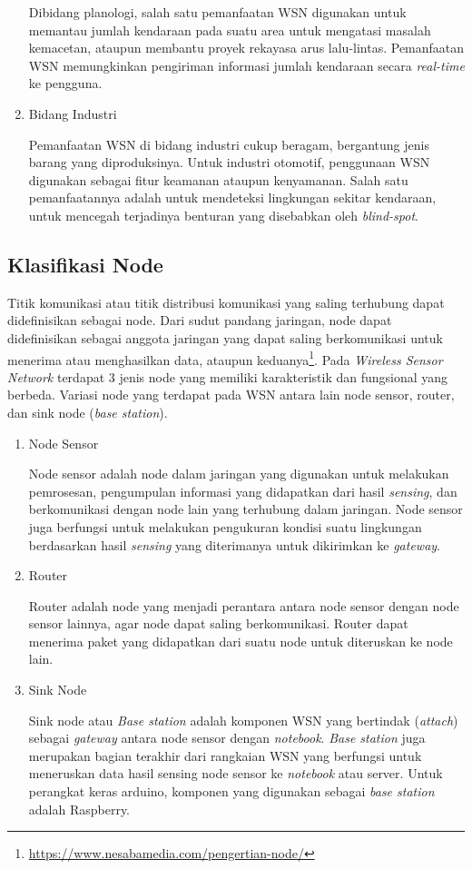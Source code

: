 \begin{enumerate}
    Dibidang planologi, salah satu pemanfaatan WSN digunakan untuk memantau jumlah kendaraan pada suatu area untuk mengatasi masalah kemacetan, ataupun membantu proyek rekayasa arus lalu-lintas. Pemanfaatan WSN memungkinkan pengiriman informasi jumlah kendaraan secara \textit{real-time} ke pengguna. 
    
    \item Bidang Industri
    
    Pemanfaatan WSN di bidang industri cukup beragam, bergantung jenis barang yang diproduksinya. Untuk industri otomotif, penggunaan WSN digunakan sebagai fitur keamanan ataupun kenyamanan. Salah satu pemanfaatannya adalah untuk mendeteksi lingkungan sekitar kendaraan, untuk mencegah terjadinya benturan yang disebabkan oleh \textit{blind-spot}.
    
\end{enumerate}

\subsection{Klasifikasi Node}
 Titik komunikasi atau titik distribusi komunikasi yang saling terhubung dapat didefinisikan sebagai node. Dari sudut pandang jaringan, node dapat didefinisikan sebagai anggota jaringan yang dapat saling berkomunikasi untuk menerima atau menghasilkan data, ataupun keduanya\footnote{\url{https://www.nesabamedia.com/pengertian-node/}}.
Pada \textit{Wireless Sensor Network} terdapat 3 jenis node yang memiliki karakteristik dan fungsional yang berbeda. Variasi node yang terdapat pada WSN antara lain node sensor, router, dan sink node (\textit{base station}).
\begin{enumerate}
    \item Node Sensor
    
    Node sensor adalah node dalam jaringan yang digunakan untuk melakukan pemrosesan, pengumpulan informasi yang didapatkan dari hasil \textit{sensing}, dan berkomunikasi dengan node lain yang terhubung dalam jaringan. Node sensor juga berfungsi untuk melakukan pengukuran kondisi suatu lingkungan berdasarkan hasil \textit{sensing} yang diterimanya untuk dikirimkan ke \textit{gateway}.
    
    \item Router
    
    Router adalah node yang menjadi perantara antara node sensor dengan node sensor lainnya, agar node dapat saling berkomunikasi. Router dapat menerima paket yang didapatkan dari suatu node untuk diteruskan ke node lain.
    
    \item Sink Node
    
    Sink node atau \textit{Base station} adalah komponen WSN yang bertindak  (\textit{attach}) sebagai \textit{gateway} antara node sensor dengan \textit{notebook}. \textit{Base station} juga merupakan bagian terakhir dari rangkaian WSN yang berfungsi untuk meneruskan data hasil sensing node sensor ke \textit{notebook} atau server. Untuk perangkat keras arduino, komponen yang digunakan sebagai \textit{base station} adalah Raspberry.
    
\end{enumerate}


